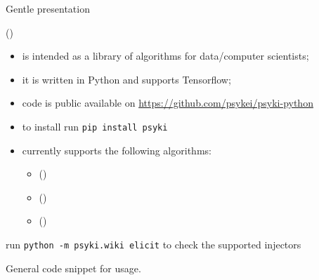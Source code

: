 \documentclass[presentation]{beamer}\mode<presentation>{\usetheme{AMSBolognaFC}}
\begin{document}
\begin{frame}[allowframebreaks]{Gentle presentation}
    \begin{block}{\longpsyki{} (\psyki) }
        \begin{itemize}
            \item \psyki is intended as a library of \ski{} algorithms for data/computer scientists;
            \item it is written in Python and supports Tensorflow;
            \item code is public available on \href{https://github.com/psykei/psyki-python}{https://github.com/psykei/psyki-python}
            \item to install run \texttt{pip install psyki}
            \item currently \psyki{} supports the following \ski{} algorithms:
            \begin{itemize}
                \item \longkins{} (\kins) 
                \item \longkill{} (\shortkill) 
                \item \longkbann{} (\kbann) 
            \end{itemize}
        \end{itemize}
    run \texttt{python -m psyki.wiki elicit} to check the supported injectors
    \end{block}

    \framebreak
    
    General code snippet for \psyki{} usage.
    
    
\end{frame}
\end{document}
